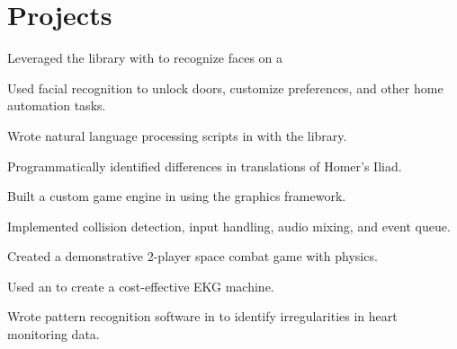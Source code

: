 \documentclass[]{resume}
\begin{document}
\begin{minipage}[t]{0.66\textwidth}

\section{Projects}

\begin{tightemize}
\item Leveraged the  library with  to recognize faces on a 
\item Used facial recognition to unlock doors, customize preferences, and other home automation tasks.
\end{tightemize}
\sectionsep

\begin{tightemize}
\item Wrote natural language processing scripts in  with the  library.
\item Programmatically identified differences in translations of Homer's Iliad.
\end{tightemize}
\sectionsep

\begin{tightemize}
\item Built a custom game engine in  using the  graphics framework.
\item Implemented collision detection, input handling, audio mixing, and event queue.
\item Created a demonstrative 2-player space combat game with physics.
\end{tightemize}
\sectionsep

\begin{tightemize}
\item Used an  to create a cost-effective EKG machine.
\item Wrote pattern recognition software in  to identify irregularities in heart monitoring data.
\end{tightemize}
\sectionsep

\end{minipage} 
\end{document}
